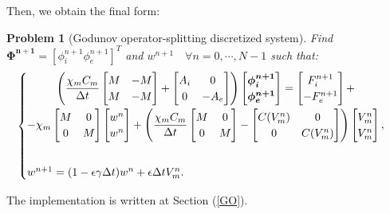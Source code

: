 \documentclass[a4paper,11pt]{article}
\newtheorem{problem}{Problem}
\begin{document}
\noindent Then, we obtain the final form:
\begin{problem}[Godunov operator-splitting discretized system] 
	Find $\bm{\Phi^{n+1}}=[\phi_i^{n+1} \phi_e^{n+1}]^T$ and $w^{n+1} \quad \forall n=0, \cdots, N-1$ such that: 
\begin{equation*}
\begin{cases}
\begin{gathered}
\left(
\frac{\chi_m C_m}{\Delta t} \begin{bmatrix}M & -M \\ M & -M\end{bmatrix}
+ \begin{bmatrix} A_i & 0 \\ 0 & -A_e \end{bmatrix}
\right) \begin{bmatrix} \bm{\phi_i^{n+1}} \\ \bm{\phi_e^{n+1}}  \end{bmatrix} =
\begin{bmatrix} F_i^{n+1} \\ -F_e^{n+1} \end{bmatrix} + \\ -
\chi_m\begin{bmatrix} M & 0 \\ 0 & M \end{bmatrix} \begin{bmatrix} w^n \\ w^n \end{bmatrix} +
\left(\frac{\chi_mC_m}{\Delta t}\begin{bmatrix} M & 0 \\ 0 & M \end{bmatrix}
- \begin{bmatrix} C(V_m^n) & 0 \\ 0 & C(V_m^n)\end{bmatrix} 
\right) \begin{bmatrix} V_m^n \\ V_m^n \end {bmatrix},
\end{gathered} \vspace{2mm}\\ \\
w^{n+1} = (1-\epsilon \gamma \Delta t) w^n + \epsilon \Delta tV_m^n.
\end{cases}
\end{equation*}
\end{problem}\vspace{4mm}
\noindent The implementation is written at Section (\ref{GO}).
\end{document}

